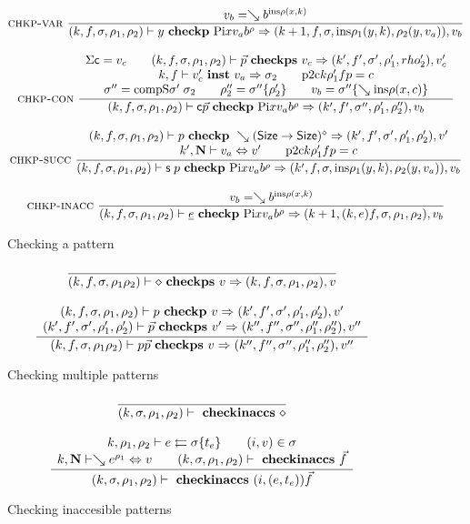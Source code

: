 \begin{figure}
\begin{gather*}
\mbox{\sc chkp-var}\ \dfrac{v_b = \searrow b^{\mathrm{ins} \rho (x,k)}}{
(k,f,\sigma,\rho_1,\rho_2)\vdash y\mbox{ \textbf{checkp} }\mathrm{Pi} x v_a b^{\rho}\Rightarrow (k+1,f,\sigma,\mathrm{ins} \rho_1 (y,k),\rho_2 (y,v_a)),v_b}
\\[2ex]
\mbox{\sc chkp-con}\ \dfrac{\begin{array}[b]{c}\mathrm{\Sigma}{\mathsf{c}}=v_c \qquad
(k,f,\sigma,\rho_1,\rho_2)\vdash\vec{p}\mbox{ \textbf{checkps} }v_c\Rightarrow (k',f',\sigma',\rho'_1,rho'_2),v'_c
\\k,f\vdash v'_c\mbox{ \textbf{inst} }v_a\Rightarrow \sigma_2 \qquad
\mathrm{p2c} k \rho'_1 f p =  c\\\sigma'' = \mathrm{compS}\sigma'\;\sigma_2 \qquad
\rho''_2 = \sigma''\{\rho'_2\} \qquad
v_b = \sigma''\{\searrow \mathrm{ins} \rho (x,c)\}
\end{array}}{(k,f,\sigma,\rho_1,\rho_2)\vdash\mathsf{c} \vec{p}\mbox{ \textbf{checkp} }\mathrm{Pi} x v_a b^{\rho}\Rightarrow (k',f',\sigma'',\rho'_1,\rho''_2),v_b
}
\\[2ex]
\mbox{\sc chkp-succ}\ \dfrac{\begin{array}[b]{c}
(k,f,\sigma,\rho_1,\rho_2)\vdash p\mbox{ \textbf{checkp} }\searrow (\mathsf{Size} \rightarrow \mathsf{Size})^{\diamond}\Rightarrow (k',f',\sigma',\rho'_1,\rho'_2),v'\\
k',\mathbf{N}\vdash v_a\Leftrightarrow v' \qquad
\mathrm{p2c} k \rho'_1 f p = c
\end{array}}{
(k,f,\sigma,\rho_1,\rho_2)\vdash\mathsf{s}\; p\mbox{ \textbf{checkp} }\mathrm{Pi} x v_a b^{\rho}\Rightarrow (k',f,\sigma,\mathrm{ins} \rho_1 (y,k),\rho_2 (y,v_a)),v_b}
\\[2ex]
\mbox{\sc chkp-inacc}\ \dfrac{v_b = \searrow b^{\mathrm{ins} \rho (x,k)}}{
(k,f,\sigma,\rho_1,\rho_2)\vdash\underline{e}\mbox{ \textbf{checkp} }\mathrm{Pi} x v_a b^{\rho}\Rightarrow (k+1,(k,e)f,\sigma,\rho_1,\rho_2),v_b}
\end{gather*}
\caption{Checking a pattern}
\end{figure}

\begin{figure}
\begin{gather*}
\ \dfrac{}{
(k,f,\sigma,\rho_1\rho_2)\vdash\diamond\mbox{ \textbf{checkps} }v\Rightarrow (k,f,\sigma,\rho_1,\rho_2),v}
\\[2ex]
\ \dfrac{\begin{array}[b]{c}(k,f,\sigma,\rho_1,\rho_2)\vdash p\mbox{ \textbf{checkp} }v\Rightarrow (k',f',\sigma',\rho'_1,\rho'_2),v'
\\(k',f',\sigma',\rho'_1,\rho'_2)\vdash\vec{p}\mbox{ \textbf{checkps} }v'\Rightarrow (k'',f'',\sigma'',\rho''_1,\rho''_2),v''
\end{array}}{
(k,f,\sigma,\rho_1\rho_2)\vdash p \vec{p}\mbox{ \textbf{checkps} }v\Rightarrow (k'',f'',\sigma'',\rho''_1,\rho''_2),v''}
\end{gather*}
\caption{Checking multiple patterns}
\end{figure}

\begin{figure}
\begin{gather*}
\ \dfrac{}{
(k,\sigma,\rho_1,\rho_2)\vdash\mbox{ \textbf{checkinaccs} }\diamond
}
\\[2ex]
\ \dfrac{\begin{array}[b]{c}
k,\rho_1,\rho_2\vdash e\leftleftarrows\sigma\{t_e\} \qquad (i,v) \in \sigma 
\\
k,\mathbf{N}\vdash\searrow e^{\rho_1}\Leftrightarrow v 
\qquad
(k,\sigma,\rho_1,\rho_2)\vdash\mbox{ \textbf{checkinaccs} }\vec{f}
\end{array}}{
(k,\sigma,\rho_1,\rho_2)\vdash\mbox{ \textbf{checkinaccs} }(i,(e,t_e)) \vec{f}
}
\end{gather*}
\caption{Checking inaccesible patterns}
\end{figure}


